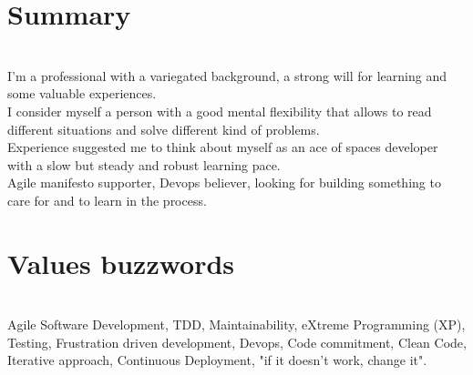 \documentclass[letterpaper]{twentysecondcv} %
\begin{document}

\section{Summary}\\
I'm a professional with a variegated background, a strong will for learning and some valuable experiences.\\
I consider myself a person with a good mental flexibility that allows to read different situations and solve different kind of problems.\\
Experience suggested me to think about myself as an ace of spaces developer with a slow but steady and robust learning pace.\\
Agile manifesto supporter, Devops believer, looking for building something to care for and to learn in the process.


\section{Values buzzwords}\\
Agile Software Development, TDD, Maintainability, eXtreme Programming (XP), Testing, Frustration driven development, Devops,
Code commitment, Clean Code, Iterative approach, Continuous Deployment, "if it doesn't work, change it".








\end{document}
